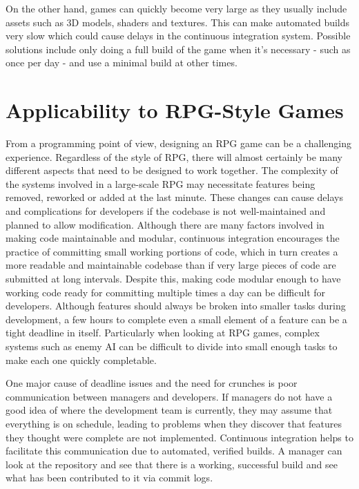 \documentclass{scrartcl}
\begin{document}
On the other hand, games can quickly become very large as they usually include assets such as 3D models, shaders and textures. This can make automated builds very slow which could cause delays in the continuous integration system. Possible solutions include only doing a full build of the game when it's necessary - such as once per day - and use a minimal build at other times. \cite{gamasutraCIprocess}


\section{Applicability to RPG-Style Games}

From a programming point of view, designing an RPG game can be a challenging experience. Regardless of the style of RPG, there will almost certainly be many different aspects that need to be designed to work together. The complexity of the systems involved in a large-scale RPG may necessitate features being removed, reworked or added at the last minute. These changes can cause delays and complications for developers if the codebase is not well-maintained and planned to allow modification. Although there are many factors involved in making code maintainable and modular, continuous integration encourages the practice of committing small working portions of code, which in turn creates a more readable and maintainable codebase than if very large pieces of code are submitted at long intervals. \cite{impactCI} \cite{mashingupInfo} Despite this, making code modular enough to have working code ready for committing multiple times a day can be difficult for developers. Although features should always be broken into smaller tasks during development, a few hours to complete even a small element of a feature can be a tight deadline in itself. Particularly when looking at RPG games, complex systems such as enemy AI can be difficult to divide into small enough tasks to make each one quickly completable.

One major cause of deadline issues and the need for crunches is poor communication between managers and developers. If managers do not have a good idea of where the development team is currently, they may assume that everything is on schedule, leading to problems when they discover that features they thought were complete are not implemented. \cite{leanManagement} Continuous integration helps to facilitate this communication due to automated, verified builds. A manager can look at the repository and see that there is a working, successful build and see what has been contributed to it via commit logs.
\end{document}
